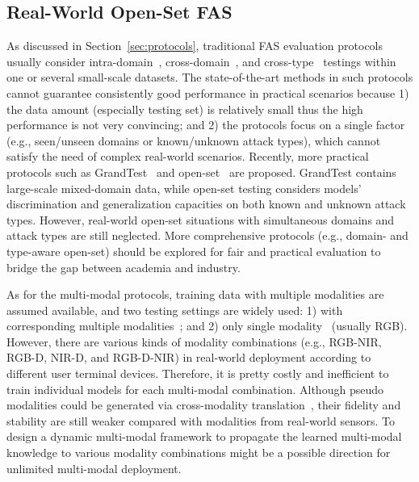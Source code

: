 \documentclass[10pt,journal,compsoc]{IEEEtran}
\begin{document}
\vspace{-0.8em}
\subsection{Real-World Open-Set FAS}
As discussed in Section~\ref{sec:protocols}, traditional FAS evaluation protocols usually consider intra-domain~\cite{Boulkenafet2017OULU}, cross-domain~\cite{shao2019multi}, and cross-type~\cite{liu2019deep} testings within one or several small-scale datasets. The state-of-the-art methods in such protocols cannot guarantee consistently good performance in practical scenarios because 1) the data amount (especially testing set) is relatively small thus the high performance is not very convincing; and 2) the protocols focus on a single factor (e.g., seen/unseen domains or known/unknown attack types), which cannot satisfy the need of complex real-world scenarios. Recently, more practical protocols such as GrandTest~\cite{perez2020learning} and open-set~\cite{liu2021contrastive,liu2020physics} are proposed. GrandTest contains large-scale mixed-domain data, while open-set testing considers models' discrimination and generalization capacities on both known and unknown attack types. However, real-world open-set situations with simultaneous domains and attack types are still neglected. More comprehensive protocols (e.g., domain- and type-aware open-set) should be explored for fair and practical evaluation to bridge the gap between academia and industry.  


As for the multi-modal protocols, training data with multiple modalities are assumed available, and two testing settings are widely used: 1) with corresponding multiple modalities~\cite{liu2020cross}; and 2) only single modality~\cite{george2021cross,liu2021face} (usually RGB). However, there are various kinds of modality combinations (e.g., RGB-NIR, RGB-D, NIR-D, and RGB-D-NIR) in real-world deployment according to different user terminal devices. Therefore, it is pretty costly and inefficient to train individual models for each multi-modal combination. Although pseudo modalities could be generated via cross-modality translation~\cite{jiang2020face,liu2021face}, their fidelity and stability are still weaker compared with modalities from real-world sensors. To design a dynamic multi-modal framework to propagate the learned multi-modal knowledge to various modality combinations might be a possible direction for unlimited multi-modal deployment. 
\end{document}

